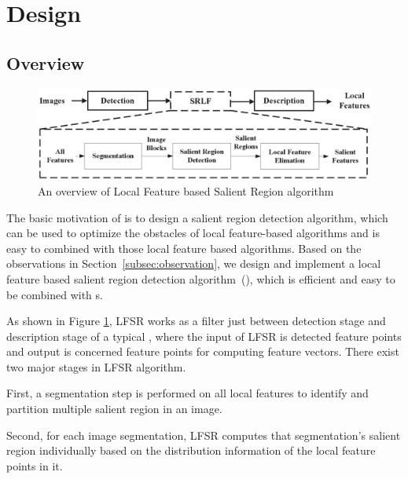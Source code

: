 \section{{\sys} Design}
\label{sec:algorithm}

\subsection{Overview}
\label{sec:algorithm_overview}

\begin{figure}[!t]
\centering
\includegraphics[width=5.0in]{images/fig-overview.eps}
\caption{An overview of Local Feature based Salient Region algorithm}
\label{fig:overview}
\end{figure}

The basic motivation of {\sys} is to design a salient region detection algorithm, which can be used to optimize the obstacles of local feature-based algorithms and is easy to combined with those local feature based algorithms. Based on the observations in Section~\ref{subsec:observation}, we design and implement a local feature based salient region detection algorithm~({\sys}), which is efficient and easy to be combined with {\lfea}s.    




As shown in Figure \ref{fig:overview}, LFSR works as a filter just between detection stage and description stage of a typical {\lfea}, where the input of LFSR is detected feature points and output is concerned feature points for computing feature vectors. There exist two major stages in LFSR algorithm.
\begin{inparaenum}
\item First, a segmentation step is performed on all local features to identify and partition multiple salient region in an image. 
\item Second, for each image segmentation, LFSR computes that segmentation's salient region individually based on the distribution information of the local feature points in it.
\end{inparaenum}

